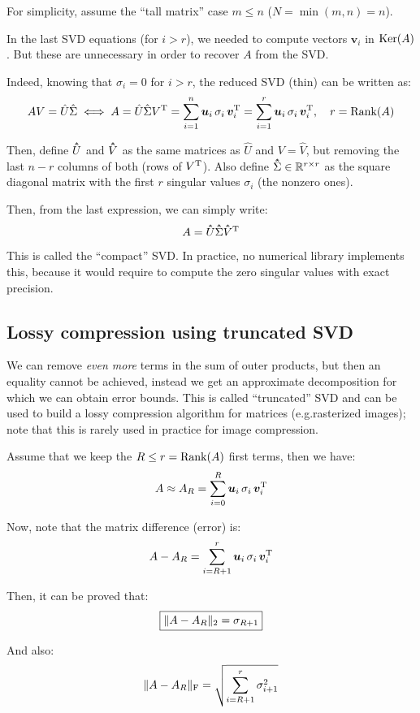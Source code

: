 \documentclass[
  12pt,
  paper=a4,
]{scrartcl} %
\begin{document}
For simplicity, assume the ``tall matrix'' case $m\le n$ ($N=\min(m,n)=n$).

In the last SVD equations (for $i>r$), we needed to compute vectors $\bm v_i$ in $\operatorname{Ker}(A)$. But these are unnecessary in order to recover $A$ from the SVD.

Indeed, knowing that $\sigma_i=0$ for $i>r$, the reduced SVD (thin) can be written as:
\[
    A{V} = \hat{U} \hat{\Sigma} \iff A = \hat{U} \hat{\Sigma}V^{\mathrm{T}}
    =\sum_{i=1}^{n}
        \bm u_i \, \sigma_i \, \bm v_i^{\mathrm{T}}
    =\sum_{i=1}^{r}
        \bm u_i \, \sigma_i \, \bm v_i^{\mathrm{T}},
\quad r=\operatorname{Rank}(A)
\]

Then, define $\hathat U$ and $\hathat V$ as the same matrices as $\hat U$ and $V=\hat V$, but removing the last $n-r$ columns of both (rows of $V^{\mathrm{T}}$). Also define $\hathat \Sigma\in\RR^{r\times r}$ as the square diagonal matrix with the first $r$ singular values $\sigma_i$ (the nonzero ones).

Then, from the last expression, we can simply write:
\[
    A = \hathat U \hathat\Sigma \hathat V\transp
\]

This is called the ``compact'' SVD. In practice, no numerical library implements this, because it would require to compute the zero singular values with exact precision.

\subsection*{Lossy compression using truncated SVD}

We can remove \emph{even more} terms in the sum of outer products, but then an equality cannot be achieved, instead we get an approximate decomposition for which we can obtain error bounds. This is called ``truncated'' SVD and can be used to build a lossy compression algorithm for matrices (e.g.\@  rasterized images); note that this is rarely used in practice for image compression.

Assume that we keep the $R\le r=\operatorname{Rank}(A)$ first terms, then we have:
\[
     A \approx A_R = \sum_{i=0}^{R} \bm u_i \, \sigma_i \, \bm v_i^{\mathrm{T}}
\]

Now, note that the matrix difference (error) is:
\[
A - A_R = \sum_{i=R+1}^{r} \bm u_i \, \sigma_i \, \bm v_i^{\mathrm{T}}
\]

Then, it can be proved that:
\[
\boxed{\|A - A_R\|_2 = \sigma_{R+1}}
\]

And also:
\[
\|A - A_R\|_{\text{F}} = \sqrt{\sum_{i=R+1}^r\sigma_{i+1}^2}
\]
\end{document}
